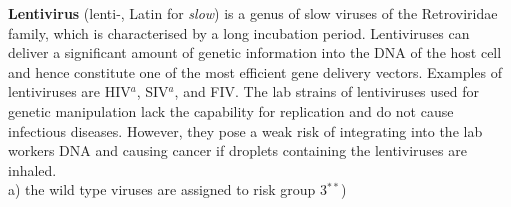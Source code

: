 \textbf{Lentivirus} (lenti-, Latin for \emph{slow}) is a genus of slow viruses of the Retroviridae family, which is characterised by a long incubation period. Lentiviruses can deliver a significant amount of genetic information into the DNA of the host cell and hence constitute one of the most efficient gene delivery vectors. Examples of lentiviruses are HIV$^a$, SIV$^a$, and FIV. The lab strains of lentiviruses used for genetic manipulation lack the capability for replication and do not cause infectious diseases. However, they pose a weak risk of integrating into the lab workers  DNA and causing cancer if droplets containing the lentiviruses are inhaled.\\
\footnotesize a) the wild type viruses are assigned to risk group 3$^{**}$)\normalsize

